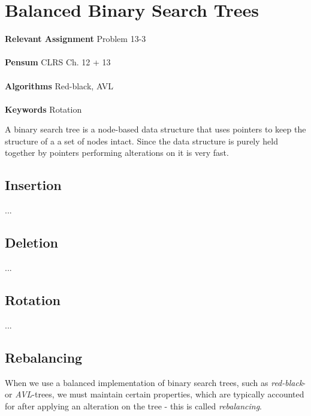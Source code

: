 
\chapter{Balanced Binary Search Trees}
\label{ch:balancedbinarysearchtrees}

\textbf{Relevant Assignment} Problem 13-3\\\\
\textbf{Pensum} CLRS Ch. 12 + 13\\\\
\textbf{Algorithms} Red-black, AVL\\\\
\textbf{Keywords} Rotation
\vspace{1in}

\noindent A binary search tree is a node-based data structure that uses
pointers to keep the structure of a a set of nodes intact. Since the data
structure is purely held together by pointers performing alterations on it
is very fast.

\newpage
\section{Insertion}
...

\section{Deletion}
...

\section{Rotation}
...

\section{Rebalancing}
When we use a balanced implementation of binary search trees, such as
\textit{red-black}- or \textit{AVL}-trees, we must maintain certain
properties, which are typically accounted for after applying an alteration on
the tree - this is called \textit{rebalancing}.

